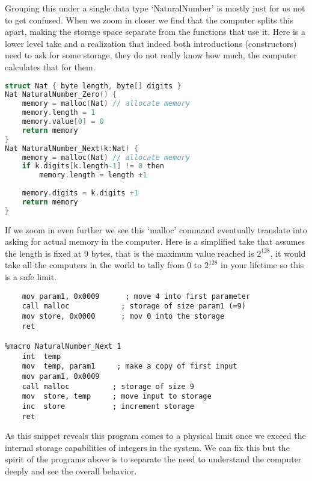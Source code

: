 Grouping this under a single data type `NaturalNumber'
is mostly just for us not to get confused.  When we 
zoom in closer we find that the computer splits 
this apart, making the storage space separate from the 
functions that use it.  Here is a lower level take
and a realization that indeed both introductions (constructors)
need to ask for some storage, they do not really know 
how much, the computer calculates that for them.
\begin{center}
\begin{lstlisting}[language=C]
struct Nat { byte length, byte[] digits }
Nat NaturalNumber_Zero() { 
    memory = malloc(Nat) // allocate memory
    memory.length = 1
    memory.value[0] = 0
    return memory 
}
Nat NaturalNumber_Next(k:Nat) {
    memory = malloc(Nat) // allocate memory
    if k.digits[k.length-1] != 0 then
        memory.length = length +1
    
    memory.digits = k.digits +1
    return memory 
}
\end{lstlisting}
\end{center}

If we zoom in even further we see this `malloc' command eventually 
translate into asking for actual memory in the computer.  Here is a
simplified take that assumes the length is fixed at 9 bytes, that is 
the maximum value reached is $2^{128}$, it would take all the computers 
in the world to tally from $0$ to $2^{128}$ in your lifetime so 
this is a safe limit.
\begin{center}
\begin{lstlisting}[language={ [x86masm]Assembler}]
%macro NaturalNumber_Zero 0
    mov param1, 0x0009      ; move 4 into first parameter
    call malloc            ; storage of size param1 (=9)
    mov store, 0x0000      ; mov 0 into the storage
    ret 

%macro NaturalNumber_Next 1
    int  temp
    mov  temp, param1     ; make a copy of first input
    mov param1, 0x0009      
    call malloc          ; storage of size 9
    mov  store, temp     ; move input to storage
    inc  store           ; increment storage 
    ret 
\end{lstlisting}
\end{center}

As this snippet reveals this program comes to a physical limit 
once we exceed the internal storage capabilities of integers in the
system.  We can fix this but the spirit of the programs above 
is to separate the need to understand the computer deeply and see the 
overall behavior.

